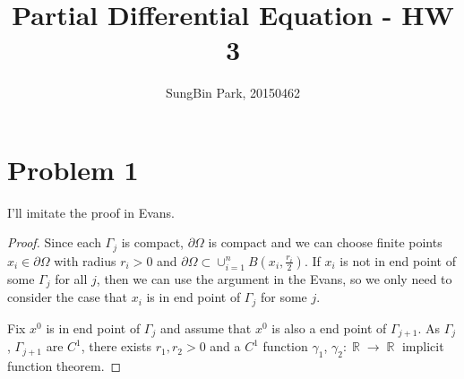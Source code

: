 \documentclass{article}
\DeclareMathOperator{\rr}{\mathbb{R}}
\begin{document}
\title{Partial Differential Equation - HW 3}
\author{SungBin Park, 20150462} 

 \maketitle

\section*{Problem 1}
I'll imitate the proof in Evans.
\begin{proof}
Since each $\Gamma_j$ is compact, $\partial \Omega$ is compact and we can choose finite points $x_i\in \partial \Omega$ with radius $r_i>0$ and $\partial \Omega\subset \cup_{i=1}^n B\left(x_i, \frac{r_i}{2}\right)$. If $x_i$ is not in end point of some $\Gamma_j$ for all $j$, then we can use the argument in the Evans, so we only need to consider the case that $x_i$ is in end point of $\Gamma_j$ for some $j$.

Fix $x^0$ is in end point of $\Gamma_j$ and assume that $x^0$ is also a end point of $\Gamma_{j+1}$. As $\Gamma_j$, $\Gamma_{j+1}$ are $C^1$, there exists $r_1,r_2>0$ and a $C^1$ function $\gamma_1$, $\gamma_2:\rr\rightarrow\rr$ implicit function theorem.
\end{proof}
\end{document}

